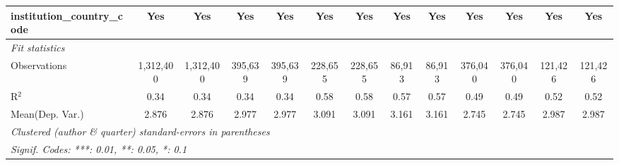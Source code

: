 \begin{tabular}{lcccccccccccc}
   institution\_country\_code               & Yes            & Yes          & Yes            & Yes          & Yes            & Yes           & Yes            & Yes            & Yes           & Yes           & Yes          & Yes\\  
   \midrule
   \emph{Fit statistics}\\
   Observations                             & 1,312,400      & 1,312,400    & 395,639        & 395,639      & 228,655        & 228,655       & 86,913         & 86,913         & 376,040       & 376,040       & 121,426      & 121,426\\  
   R$^2$                                    & 0.34           & 0.34         & 0.34           & 0.34         & 0.58           & 0.58          & 0.57           & 0.57           & 0.49          & 0.49          & 0.52         & 0.52\\  
Mean(Dep. Var.) & 2.876 & 2.876 & 2.977 & 2.977 & 3.091 & 3.091 & 3.161 & 3.161 & 2.745 & 2.745 & 2.987 & 2.987 \\
   \midrule \midrule
   \multicolumn{13}{l}{\emph{Clustered (author \& quarter) standard-errors in parentheses}}\\
   \multicolumn{13}{l}{\emph{Signif. Codes: ***: 0.01, **: 0.05, *: 0.1}}\\
\end{tabular}
\par\endgroup
